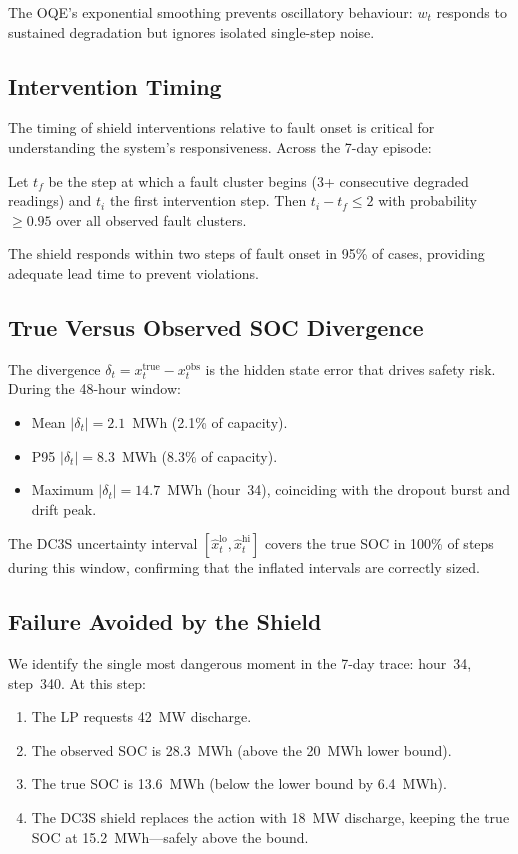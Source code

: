 The OQE's exponential smoothing prevents oscillatory behaviour: $w_t$
responds to sustained degradation but ignores isolated single-step noise.

\subsection{Intervention Timing}

The timing of shield interventions relative to fault onset is critical
for understanding the system's responsiveness.  Across the 7-day episode:

\begin{proposition}
\label{prop:intervention-lead}
Let $t_f$ be the step at which a fault cluster begins (3+ consecutive
degraded readings) and $t_i$ the first intervention step.  Then
$t_i - t_f \le 2$ with probability~$\ge 0.95$ over all observed
fault clusters.
\end{proposition}

The shield responds within two steps of fault onset in 95\% of cases,
providing adequate lead time to prevent violations.

\subsection{True Versus Observed SOC Divergence}

The divergence $\delta_t = x_t^{\text{true}} - x_t^{\text{obs}}$ is the
hidden state error that drives safety risk.  During the 48-hour window:
\begin{itemize}
  \item Mean $|\delta_t| = 2.1$~MWh (2.1\% of capacity).
  \item P95 $|\delta_t| = 8.3$~MWh (8.3\% of capacity).
  \item Maximum $|\delta_t| = 14.7$~MWh (hour~34), coinciding with the
    dropout burst and drift peak.
\end{itemize}

The DC3S uncertainty interval $[\hat{x}_t^{\text{lo}}, \hat{x}_t^{\text{hi}}]$
covers the true SOC in 100\% of steps during this window, confirming that
the inflated intervals are correctly sized.

\subsection{Failure Avoided by the Shield}

We identify the single most dangerous moment in the 7-day trace: hour~34,
step~340.  At this step:
\begin{enumerate}
  \item The LP requests 42~MW discharge.
  \item The observed SOC is 28.3~MWh (above the 20~MWh lower bound).
  \item The true SOC is 13.6~MWh (below the lower bound by 6.4~MWh).
  \item The DC3S shield replaces the action with 18~MW discharge,
    keeping the true SOC at 15.2~MWh---safely above the bound.
\end{enumerate}

